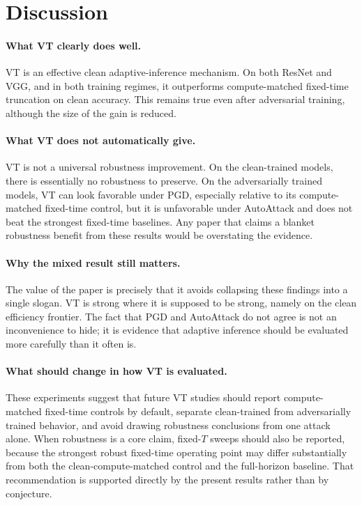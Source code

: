 \documentclass[11pt]{article}
\begin{document}
\begin{table}[t]
\section{Discussion}
\paragraph{What VT clearly does well.}
VT is an effective clean adaptive-inference mechanism. On both ResNet and VGG, and in both training regimes, it outperforms compute-matched fixed-time truncation on clean accuracy. This remains true even after adversarial training, although the size of the gain is reduced.

\paragraph{What VT does not automatically give.}
VT is not a universal robustness improvement. On the clean-trained models, there is essentially no robustness to preserve. On the adversarially trained models, VT can look favorable under PGD, especially relative to its compute-matched fixed-time control, but it is unfavorable under AutoAttack and does not beat the strongest fixed-time baselines. Any paper that claims a blanket robustness benefit from these results would be overstating the evidence.

\paragraph{Why the mixed result still matters.}
The value of the paper is precisely that it avoids collapsing these findings into a single slogan. VT is strong where it is supposed to be strong, namely on the clean efficiency frontier. The fact that PGD and AutoAttack do not agree is not an inconvenience to hide; it is evidence that adaptive inference should be evaluated more carefully than it often is.

\paragraph{What should change in how VT is evaluated.}
These experiments suggest that future VT studies should report compute-matched fixed-time controls by default, separate clean-trained from adversarially trained behavior, and avoid drawing robustness conclusions from one attack alone. When robustness is a core claim, fixed-$T$ sweeps should also be reported, because the strongest robust fixed-time operating point may differ substantially from both the clean-compute-matched control and the full-horizon baseline. That recommendation is supported directly by the present results rather than by conjecture.


\end{table}
\end{document}
